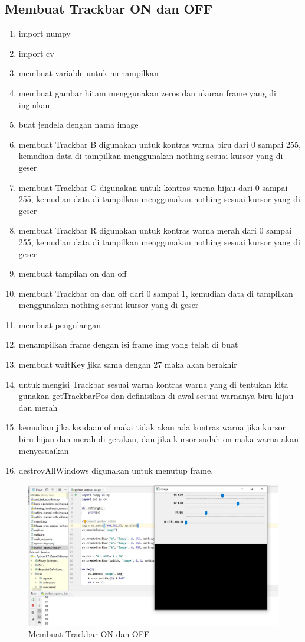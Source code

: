 \subsection{Membuat Trackbar ON dan OFF}

\begin{enumerate}
	\item import numpy
	\item import cv
	\item membuat variable untuk menampilkan
	\item membuat gambar hitam menggunakan zeros dan ukuran frame yang di inginkan
	\item buat jendela dengan nama image
	\item membuat Trackbar B digunakan untuk kontras warna biru dari 0 sampai 255, kemudian data di tampilkan menggunakan nothing sesuai kursor yang di geser
	\item membuat Trackbar G digunakan untuk kontras warna hijau dari 0 sampai 255, kemudian data di tampilkan menggunakan nothing sesuai kursor yang di geser
	\item membuat Trackbar R digunakan untuk kontras warna merah dari 0 sampai 255, kemudian data di tampilkan menggunakan nothing sesuai kursor yang di geser
	\item membuat tampilan on dan off
	\item membuat Trackbar on dan off dari 0 sampai 1, kemudian data di tampilkan menggunakan nothing sesuai kursor yang di geser
	\item membuat pengulangan 
	\item menampilkan frame dengan isi frame img yang telah di buat
	\item membuat waitKey jika sama dengan 27 maka akan berakhir
	\item untuk mengisi Trackbar sesuai warna kontras warna yang di tentukan kita gunakan getTrackbarPos dan definisikan di awal sesuai warnanya biru hijau dan merah 
	\item kemudian jika keadaan of maka tidak akan ada kontras warna jika kursor biru hijau dan merah di gerakan, dan jika kursor sudah on maka warna akan menyesuaikan
	\item destroyAllWindows digunakan untuk menutup frame.
\end{enumerate}

\newpage
\begin{figure}[ht]
\centering
\includegraphics[scale=0.42]{figures/2,32.jpg}
\caption{Membuat Trackbar ON dan OFF}
\label{contoh}
\end{figure}


